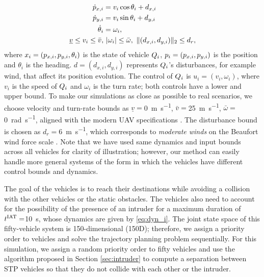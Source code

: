 \begin{equation}
\label{eq:dyn_i}
\begin{aligned}
\dot{\pos}_{x,i} &= v_i \cos \theta_i + d_{x,i} \\
\dot{\pos}_{y,i} &= v_i \sin \theta_i + d_{y,i}\\
\dot{\theta}_i &= \omega_i, \\
\underline{v} \le v_i \le \bar{v}, & ~|\omega_i| \le \bar{\omega}, ~\|(d_{x,i}, d_{y,i}) \|_2 \le d_{r},
\end{aligned}
\end{equation}
\noindent where $x_i = (p_{x,i}, p_{y,i}, \theta_i)$ is the state of vehicle $Q_i$, $p_i = (p_{x,i}, p_{y,i})$ is the position and $\theta_i$ is the heading. $d = (d_{x,i}, d_{y,i})$ represents $Q_i$'s disturbances, for example wind, that affect its position evolution. The control of $Q_i$ is $u_i = (v_i, \omega_i)$, where $v_i$ is the speed of $Q_i$ and $\omega_i$ is the turn rate; both controls have a lower and upper bound. To make our simulations as close as possible to real scenarios, we choose velocity and turn-rate bounds as $\underline{v} = $\SI{0}{\m\per\s}, $\bar{v} = $\SI{25}{\m\per\s}, $\bar\omega = $\SI{0}{\radian\per\s}, aligned with the modern UAV specifications \cite{UAVspecs1, UAVspecs2}. The disturbance bound is chosen as $d_{r} = $\SI{6}{\m\per\s}, which corresponds to \textit{moderate winds} on the Beaufort wind force scale \cite{Windscale}. Note that we have used same dynamics and input bounds across all vehicles for clarity of illustration; however, our method can easily handle more general systems of the form in which the vehicles have different control bounds and dynamics.

The goal of the vehicles is to reach their destinations while avoiding a collision with the other vehicles or the static obstacles. The vehicles also need to account for the possibility of the presence of an intruder for a maximum duration of $t^\text{IAT} = $\SI{10}{\s}, whose dynamics are given by \eqref{eq:dyn_i}. The joint state space of this fifty-vehicle system is 150-dimensional (150D); therefore, we assign a priority order to vehicles and solve the trajectory planning problem sequentially. For this simulation, we assign a random priority order to fifty vehicles and use the algorithm proposed in Section \ref{sec:intruder} to compute a separation between STP vehicles so that they do not collide with each other or the intruder. 

